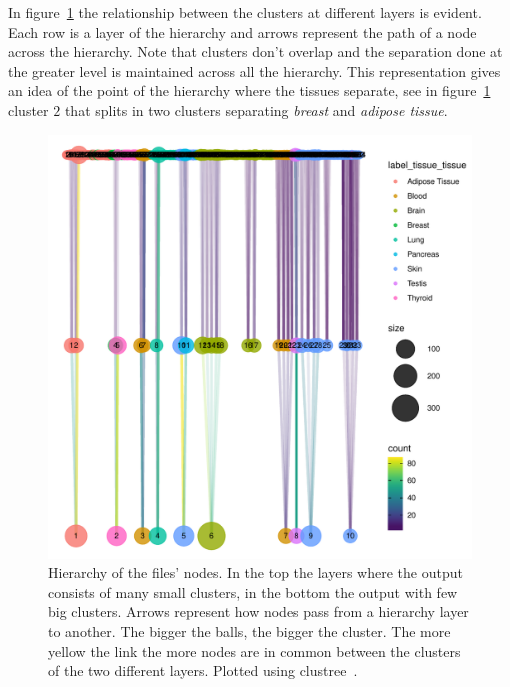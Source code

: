 In figure~\ref{fig:topic/gtex/oversigma_10tissue/bipartite_rebuild} the relationship between the clusters at different layers is evident. Each row is a layer of the hierarchy and arrows represent the path of a node across the hierarchy. Note that clusters don't overlap and the separation done at the greater level is maintained across all the hierarchy. This representation gives an idea of the point of the hierarchy where the tissues separate, see in figure~\ref{fig:topic/gtex/oversigma_10tissue/bipartite_rebuild} cluster $2$ that splits in two clusters separating \textit{breast} and \textit{adipose tissue}.
\begin{figure}[htb!]
    \centering
    \includegraphics[width=0.8\linewidth]{pictures/topic/gtex/oversigma_10tissue/bipartite_rebuild.pdf}
    \caption{Hierarchy of the files' nodes. In the top the layers where the output consists of many small clusters, in the bottom the output with few big clusters. Arrows represent how nodes pass from a hierarchy layer to another. The bigger the balls, the bigger the cluster. The more yellow the link the more nodes are in common between the clusters of the two different layers. Plotted using clustree~\cite{clustree}.}
    \label{fig:topic/gtex/oversigma_10tissue/bipartite_rebuild}
\end{figure}

